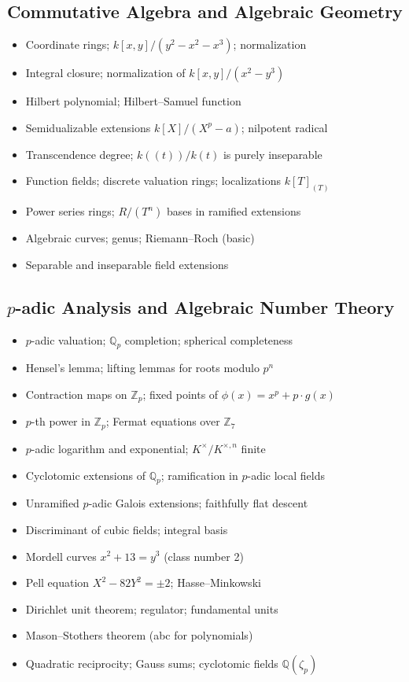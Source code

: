 \subsection{Commutative Algebra and Algebraic Geometry}

\begin{itemize}
  \item Coordinate rings; $k[x,y]/(y^2-x^2-x^3)$; normalization
  \item Integral closure; normalization of $k[x,y]/(x^2-y^3)$
  \item Hilbert polynomial; Hilbert--Samuel function
  \item Semidualizable extensions $k[X]/(X^p-a)$; nilpotent radical
  \item Transcendence degree; $k((t))/k(t)$ is purely inseparable
  \item Function fields; discrete valuation rings; localizations $k[T]_{(T)}$
  \item Power series rings; $R/(T^n)$ bases in ramified extensions
  \item Algebraic curves; genus; Riemann--Roch (basic)
  \item Separable and inseparable field extensions
\end{itemize}

\subsection{$p$-adic Analysis and Algebraic Number Theory}

\begin{itemize}
  \item $p$-adic valuation; $\mathbb{Q}_p$ completion; spherical completeness
  \item Hensel's lemma; lifting lemmas for roots modulo $p^n$
  \item Contraction maps on $\mathbb{Z}_p$; fixed points of $\phi(x)=x^p+p\cdot g(x)$
  \item $p$-th power in $\mathbb{Z}_p$; Fermat equations over $\mathbb{Z}_7$
  \item $p$-adic logarithm and exponential; $K^\times/K^{\times,n}$ finite
  \item Cyclotomic extensions of $\mathbb{Q}_p$; ramification in $p$-adic local fields
  \item Unramified $p$-adic Galois extensions; faithfully flat descent
  \item Discriminant of cubic fields; integral basis
  \item Mordell curves $x^2+13=y^3$ (class number 2)
  \item Pell equation $X^2-82Y^2=\pm2$; Hasse--Minkowski
  \item Dirichlet unit theorem; regulator; fundamental units
  \item Mason--Stothers theorem (abc for polynomials)
  \item Quadratic reciprocity; Gauss sums; cyclotomic fields $\mathbb{Q}(\zeta_p)$
\end{itemize}


